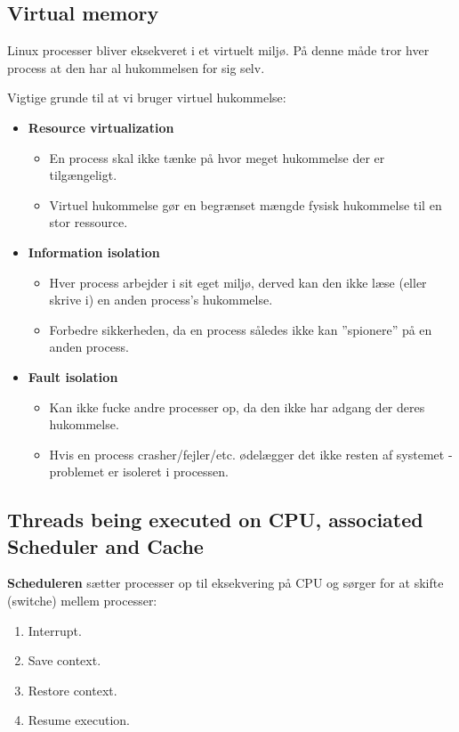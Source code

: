 \subsection{Virtual memory}
Linux processer bliver eksekveret i et virtuelt miljø. På denne måde tror hver process at den har al hukommelsen for sig selv.\\

\begin{minipage}{\linewidth}
Vigtige grunde til at vi bruger virtuel hukommelse:
	\begin{itemize}
		\item \textbf{Resource virtualization}
		\begin{itemize}
			\item En process skal ikke tænke på hvor meget hukommelse der er tilgængeligt.
			\item Virtuel hukommelse gør en begrænset mængde fysisk hukommelse til en stor ressource.
		\end{itemize}
		\item \textbf{Information isolation}
		\begin{itemize}
			\item Hver process arbejder i sit eget miljø, derved kan den ikke læse (eller skrive i) en anden process's hukommelse.
			\item Forbedre sikkerheden, da en process således ikke kan ''spionere'' på en anden process.
		\end{itemize}
		\item \textbf{Fault isolation}
		\begin{itemize}
			\item Kan ikke fucke andre processer op, da den ikke har adgang der deres hukommelse.
			\item Hvis en process crasher/fejler/etc. ødelægger det ikke resten af systemet - problemet er isoleret i processen.
		\end{itemize}
	\end{itemize}
\end{minipage}

\subsection{Threads being executed on CPU, associated Scheduler and Cache}\label{sec:execpu}
\textbf{Scheduleren} sætter processer op til eksekvering på CPU og sørger for at skifte (switche) mellem processer:

\begin{enumerate}
	\item Interrupt.
	\item Save context.
	\item Restore context.
	\item Resume execution.
\end{enumerate}

